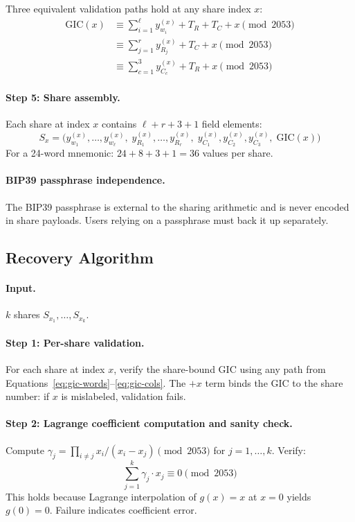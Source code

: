 \documentclass[11pt]{article}
\begin{document}
Three equivalent validation paths hold at any share index $x$:
\begin{align}
    \text{GIC}(x) &\equiv \sum_{i=1}^{\ell} y_{w_i}^{(x)} + T_R + T_C + x \pmod{2053} \label{eq:gic-words} \\
    &\equiv \sum_{j=1}^{r} y_{R_j}^{(x)} + T_C + x \pmod{2053} \label{eq:gic-rows} \\
    &\equiv \sum_{c=1}^{3} y_{C_c}^{(x)} + T_R + x \pmod{2053} \label{eq:gic-cols}
\end{align}

\paragraph{Step 5: Share assembly.} Each share at index $x$ contains $\ell + r + 3 + 1$ field elements:
\[
    S_x = \bigl(y_{w_1}^{(x)}, \ldots, y_{w_\ell}^{(x)},\; y_{R_1}^{(x)}, \ldots, y_{R_r}^{(x)},\; y_{C_1}^{(x)}, y_{C_2}^{(x)}, y_{C_3}^{(x)},\; \text{GIC}(x)\bigr)
\]
For a 24-word mnemonic: $24 + 8 + 3 + 1 = 36$ values per share.

\paragraph{BIP39 passphrase independence.} The BIP39 passphrase is external to the sharing arithmetic and is never encoded in share payloads. Users relying on a passphrase must back it up separately.

\subsection{Recovery Algorithm}
\label{sec:recovery}

\paragraph{Input.} $k$ shares $S_{x_1}, \ldots, S_{x_k}$.

\paragraph{Step 1: Per-share validation.} For each share at index $x$, verify the share-bound GIC using any path from Equations~\eqref{eq:gic-words}--\eqref{eq:gic-cols}. The $+x$ term binds the GIC to the share number: if $x$ is mislabeled, validation fails.

\paragraph{Step 2: Lagrange coefficient computation and sanity check.} Compute $\gamma_j = \prod_{i \neq j} x_i / (x_i - x_j) \pmod{2053}$ for $j = 1, \ldots, k$. Verify:
\begin{equation}
    \sum_{j=1}^{k} \gamma_j \cdot x_j \equiv 0 \pmod{2053} \label{eq:lagrange-sanity}
\end{equation}
This holds because Lagrange interpolation of $g(x) = x$ at $x = 0$ yields $g(0) = 0$. Failure indicates coefficient error.
\end{document}
